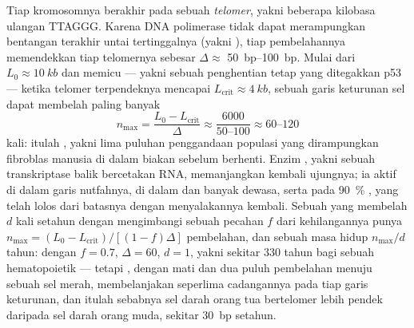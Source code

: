 \begin{theorem}\label{thm:b3:stem-cells:hayflick}
%
Tiap kromosomnya berakhir pada sebuah \emph{telomer}, yakni beberapa kilobasa
ulangan TTAGGG. Karena DNA polimerase tidak dapat merampungkan bentangan terakhir
untai tertinggalnya (yakni \emph{}), tiap
pembelahannya memendekkan tiap telomernya sebesar $\Delta \approx$ \qtyrange{50}{100}{bp}.
Mulai dari $L_{0} \approx \qty{10}{kb}$ dan memicu
\emph{} --- yakni sebuah penghentian tetap yang ditegakkan p53 ---
ketika telomer terpendeknya mencapai $L_{\text{crit}} \approx \qty{4}{kb}$,
sebuah garis keturunan sel dapat membelah paling banyak
\[
n_{\max} = \frac{L_{0} - L_{\text{crit}}}{\Delta} \approx \frac{6000}{50\text{--}100} \approx 60\text{--}120
\]
kali: itulah \emph{}, yakni lima puluhan penggandaan populasi
yang dirampungkan fibroblas manusia di dalam biakan sebelum berhenti. Enzim
\emph{}, yakni sebuah transkriptase balik bercetakan RNA,
memanjangkan kembali ujungnya; ia aktif di dalam garis nutfahnya, di dalam  dan
banyak  dewasa, serta pada \qty{90}{\%} , yang telah
lolos dari batasnya dengan menyalakannya kembali. Sebuah  yang membelah
$d$ kali setahun dengan  mengimbangi sebuah pecahan $f$ dari
kehilangannya punya $n_{\max} = (L_{0} - L_{\text{crit}})/[(1 - f)\Delta]$
pembelahan, dan sebuah masa hidup $n_{\max}/d$ tahun: dengan $f = 0.7$, $\Delta
= 60$, $d = 1$, yakni sekitar 330 tahun bagi sebuah  hematopoietik --- tetapi
, dengan  mati dan dua puluh pembelahan menuju sebuah sel
merah, membelanjakan seperlima cadangannya pada tiap garis keturunan, dan itulah sebabnya
sel darah orang tua bertelomer lebih pendek daripada sel darah orang muda,
sekitar \qty{30}{bp} setahun.
\end{theorem}
